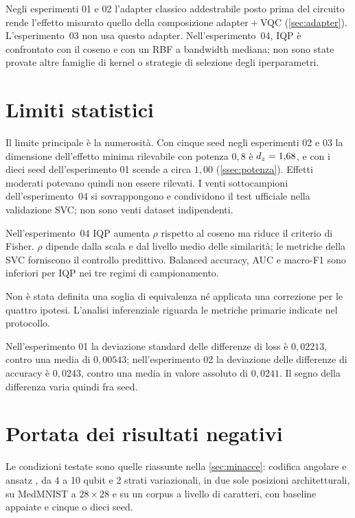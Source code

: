 Negli esperimenti 01 e 02 l'adapter classico addestrabile posto prima del
circuito rende l'effetto misurato quello della
composizione adapter${}+{}$VQC (\cref{sec:adapter}). L'esperimento~03 non usa
questo adapter. Nell'esperimento~04, IQP è confrontato con il coseno e con un RBF
a bandwidth mediana; non sono state provate altre famiglie di kernel o strategie
di selezione degli iperparametri.

\section{Limiti statistici}
\label{sec:limiti-statistici}

Il limite principale è la numerosità. Con cinque seed negli esperimenti 02 e 03 la
dimensione dell'effetto minima rilevabile con potenza $0{,}8$ è $d_z = 1{,}68$, e
con i dieci seed dell'esperimento 01 scende a circa $1{,}00$
(\cref{ssec:potenza}). Effetti moderati potevano quindi non essere rilevati. I
venti sottocampioni dell'esperimento~04 si sovrappongono e condividono il test
ufficiale nella validazione SVC; non sono venti dataset indipendenti.

Nell'esperimento~04 IQP aumenta $\rho$ rispetto al coseno ma riduce il criterio
di Fisher. $\rho$ dipende dalla scala e dal livello medio delle similarità; le
metriche della SVC forniscono il controllo predittivo. Balanced accuracy, AUC e
macro-F1 sono inferiori per IQP nei tre regimi di campionamento.

Non è stata definita una soglia di equivalenza né applicata una correzione per le
quattro ipotesi. L'analisi inferenziale riguarda le metriche primarie indicate
nel protocollo.

Nell'esperimento 01 la deviazione standard delle differenze di loss è
$0{,}02213$, contro una media di $0{,}00543$; nell'esperimento 02 la deviazione
delle differenze di accuracy è $0{,}0243$, contro una media in valore assoluto di
$0{,}0241$. Il segno della differenza varia quindi fra seed.

\section{Portata dei risultati negativi}
\label{sec:portata}

Le condizioni testate sono quelle riassunte nella \cref{sec:minacce}: codifica
angolare e ansatz , da 4 a 10 qubit e 2 strati
variazionali, in due sole posizioni architetturali, su MedMNIST a $28\times28$ e
su un corpus a livello di caratteri, con baseline appaiate e cinque o dieci seed.

